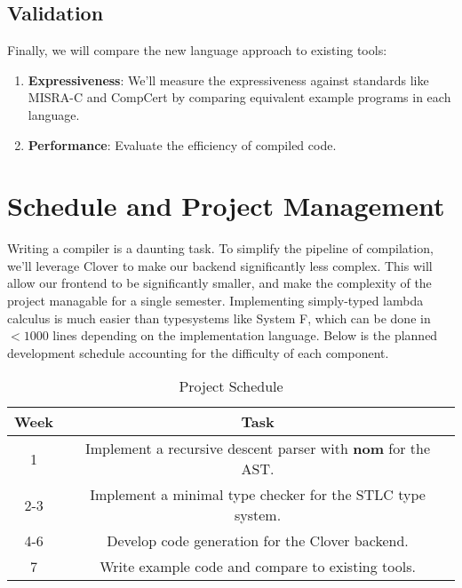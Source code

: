 \documentclass[conference]{IEEEtran}
\begin{document}
\subsection{Validation}

Finally, we will compare the new language approach to existing tools:

\begin{enumerate}
    \item \textbf{Expressiveness}: We'll measure the expressiveness against standards like MISRA-C and CompCert by comparing equivalent example programs in each language.
    \item \textbf{Performance}: Evaluate the efficiency of compiled code.
    
\end{enumerate}

\section{Schedule and Project Management}

Writing a compiler is a daunting task. To simplify the pipeline of compilation, we'll leverage Clover to make our backend significantly less complex. This will allow our frontend to be significantly smaller, and make the complexity of the project managable for a single semester. Implementing simply-typed lambda calculus is much easier than typesystems like System F, which can be done in $<1000$ lines depending on the implementation language. Below is the planned development schedule accounting for the difficulty of each component.

\begin{table}[h!]
    \centering
    \label{tab:schedule}
    \caption{Project Schedule}
    \begin{tabular}{|c|c|}
        \hline
         Week & Task \\
         \hline
         1 & Implement a recursive descent parser with \textbf{nom} for the AST.\\ \hline
         2-3 & Implement a minimal type checker for the STLC type system. \\ \hline
         4-6 & Develop code generation for the Clover backend. \\ \hline
         7 & Write example code and compare to existing tools. \\ \hline
    \end{tabular}
\end{table}
\end{document}
